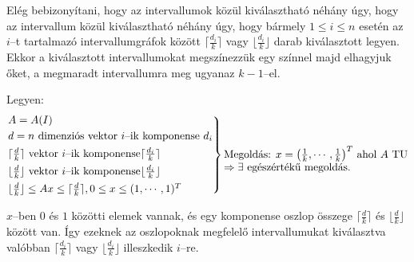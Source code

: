 Elég bebizonyítani, hogy az intervallumok közül kiválasztható néhány úgy, hogy
az intervallum közül kiválasztható néhány úgy, hogy bármely $1 \leq i \leq n$
esetén az $i$--t tartalmazó intervallumgráfok között $\lceil \frac{d_i}{k}
\rceil$ vagy $\lfloor \frac{d_i}{k} \rfloor$ darab kiválasztott legyen. Ekkor a
kiválasztott intervallumokat megszínezzük egy színnel majd elhagyjuk őket, a
megmaradt intervallumra meg ugyanaz $k-1$--el.

Legyen:
\[\begin{rcases}
A=A(I) \\
d = n \text{ dimenziós vektor } i \text{--ik komponense } d_i \\
\lceil \frac{d}{k} \rceil \text{ vektor } i \text{--ik komponense} \lceil \frac{d_i}{k} \rceil \\
\lfloor \frac{d}{k} \rfloor \text{ vektor } i \text{--ik komponense} \lfloor \frac{d_i}{k} \rfloor \\
\lfloor \frac{d}{k} \rfloor \leq Ax \leq \lceil \frac{d}{k} \rceil, 0 \leq x \leq (1,\cdots, 1)^T
\end{rcases} \parbox[t]{6cm}{Megoldás: $x=\left( \frac{1}{k}, \cdots, \frac{1}{k} \right)^T$ ahol $A$
TU $\Rightarrow \exists$ egészértékű megoldás.} 
\]

$x$--ben $0$ és $1$ közötti elemek vannak, és egy komponense oszlop összege
$\lceil \frac{d}{k} \rceil$ és $ \lfloor \frac{d}{k} \rfloor$ között van. Így
ezeknek az oszlopoknak megfelelő intervallumukat kiválasztva valóbban $\lceil
\frac{d_i}{k} \rceil$ vagy $ \lfloor \frac{d_i}{k} \rfloor$ illeszkedik $i$--re.